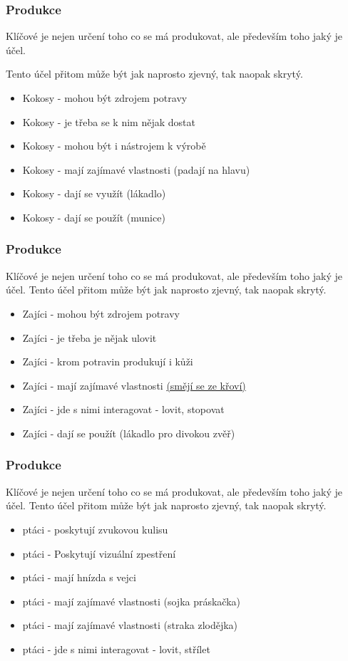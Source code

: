 ﻿\documentclass[a4paper]{beamer}
\begin{document}
\begin{frame}
\frametitle{Produkce}

Klíčové je nejen určení toho co se má produkovat, ale především toho jaký je účel.

Tento účel přitom může být jak naprosto zjevný, tak naopak skrytý.

\begin{itemize}
    \item Kokosy - mohou být zdrojem potravy
    \item Kokosy - je třeba se k nim nějak dostat
    \item Kokosy - mohou být i nástrojem k výrobě
    \item Kokosy - mají zajímavé vlastnosti (padají na hlavu)
    \item Kokosy - dají se využít (lákadlo)
    \item Kokosy - dají se použít (munice)
\end{itemize}
\end{frame}

\begin{frame}
\frametitle{Produkce}

Klíčové je nejen určení toho co se má produkovat, ale především toho jaký je účel.
\vfill
Tento účel přitom může být jak naprosto zjevný, tak naopak skrytý.

\begin{itemize}
    \item Zajíci - mohou být zdrojem potravy
    \item Zajíci - je třeba je nějak ulovit
    \item Zajíci - krom potravin produkují i kůži
    \item Zajíci - mají zajímavé vlastnosti \href{https://youtu.be/z3BVMkpmC2M?t=22}{(smějí se ze křoví)} 
    \item Zajíci - jde s nimi interagovat - lovit, stopovat
    \item Zajíci - dají se použít (lákadlo pro divokou zvěř)
\end{itemize}
\end{frame}

\begin{frame}
\frametitle{Produkce}

Klíčové je nejen určení toho co se má produkovat, ale především toho jaký je účel.
\vfill
Tento účel přitom může být jak naprosto zjevný, tak naopak skrytý.

\begin{itemize}
    \item ptáci - poskytují zvukovou kulisu
    \item ptáci - Poskytují vizuální zpestření
    \item ptáci - mají hnízda s vejci
    \item ptáci - mají zajímavé vlastnosti (sojka práskačka)
    \item ptáci - mají zajímavé vlastnosti (straka zlodějka)    
    \item ptáci - jde s nimi interagovat - lovit, střílet
\end{itemize}
\end{frame}
\end{document}
